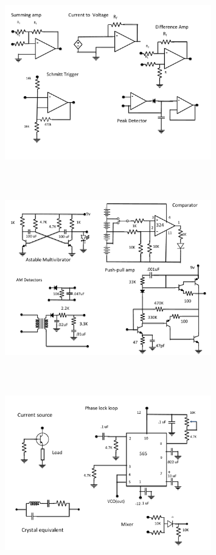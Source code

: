 \begin{figure} 
\center
\includegraphics[width=0.8\textwidth,natwidth=642,natheight=610, height=80mm, width=88mm]{circuit12.pdf}
\end{figure}
\begin{figure} 
\center
\includegraphics[width=0.8\textwidth,natwidth=642,natheight=610, height=80mm, width=88mm]{circuit13.pdf}
\end{figure}
\begin{figure} 
\center
\includegraphics[width=0.8\textwidth,natwidth=642,natheight=610, height=80mm, width=88mm]{circuit14.pdf}
\end{figure}

